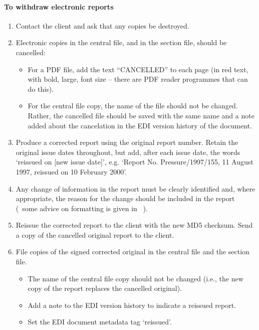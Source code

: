 \paragraph{To withdraw electronic reports}
\begin{enumerate}
\item Contact the client and ask that any copies be destroyed. 

\item Electronic copies in the central file, and in the section file, should be cancelled:
\begin{itemize}
\item For a PDF file, add the text “{\color{red}CANCELLED}” to each page (in red text, with bold, large, font size – there are PDF reader programmes that can do this). 
\item For the central file copy, the name of the file should not be changed. Rather, the cancelled file should be saved with the same name and a note added about the cancelation in the EDI version history of the document. 
\end{itemize}

\item Produce a corrected report using the original report number.  Retain the original issue dates throughout, but add, after each issue date, the words ‘reissued on [new issue date]’, e.g. ‘Report No. Pressure/1997/155, 11 August 1997, reissued on 10 February 2000’.

\item Any change of information in the report must be clearly identified and, where appropriate, the reason for the change should be included in the report (~some advice on formatting is given in \cite[\S\ref*{GRP-ss:reissued_reports}]{MSL_Reporting_Guidelines}~).

\item Reissue the corrected report to the client with the new MD5 checksum. Send a copy of the cancelled original report to the client. 

\item File copies of the signed corrected original in the central file and the section file. 
\begin{itemize}
\item The name of the central file copy should not be changed (i.e., the new copy of the report replaces the cancelled original). 
\item Add a note to the EDI version history to indicate a reissued report.
\item Set the EDI document metadata tag `reissued'.
\end{itemize}
\end{enumerate}

